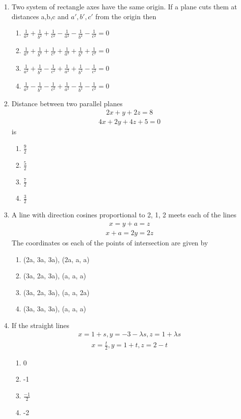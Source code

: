 \begin{enumerate}[label=\arabic*.,ref=\thesubsection.\theenumi]
\item Two system of rectangle axes have the same origin. If a plane cuts them at distances a,b,c and $a',b',c'$ from the origin then
\begin{enumerate}
\item $\frac{1}{a^2} + \frac{1}{b^2} + \frac{1}{c^2} - \frac{1}{a^2} - \frac{1}{b^2} - \frac{1}{c^2} = 0$
\item $\frac{1}{a^2} + \frac{1}{b^2} + \frac{1}{c^2} + \frac{1}{a^2} + \frac{1}{b^2} + \frac{1}{c^2} = 0$
\item $\frac{1}{a^2} + \frac{1}{b^2} - \frac{1}{c^2} + \frac{1}{a^2} + \frac{1}{b^2} - \frac{1}{c^2} = 0$
\item $\frac{1}{a^2} - \frac{1}{b^2} - \frac{1}{c^2} + \frac{1}{a^2} - \frac{1}{b^2} - \frac{1}{c^2} = 0$
\end{enumerate}

\item Distance between two parallel planes 
\begin{align}
2x + y + 2z = 8
\end{align}
\begin{align}
4x + 2y + 4z + 5 = 0 
\end{align}
is
\begin{enumerate}
\item $\frac{9}{2}$
\item $\frac{5}{2}$
\item $\frac{7}{2}$
\item $\frac{3}{2}$
\end{enumerate}

\item A line with direction cosines proportional to 2, 1, 2 meets each of the lines 
\begin{align}
x = y + a = z
\end{align}
\begin{align}
x + a = 2y = 2z
\end{align}
The coordinates os each of the points of intersection are given by
\begin{enumerate}
\item (2a, 3a, 3a), (2a, a, a)
\item (3a, 2a, 3a), (a, a, a)
\item (3a, 2a, 3a), (a, a, 2a)
\item (3a, 3a, 3a), (a, a, a)
\end{enumerate}

\item If the straight lines
\begin{align}
x = 1 + s, y = -3 -\lambda s, z = 1 + \lambda s
\end{align}
\begin{align}
x = \frac{t}{2}, y = 1 + t, z = 2 - t
\end{align}
\begin{enumerate}
\item 0
\item -1
\item $\frac{-1}{2}$
\item -2
\end{enumerate}


\end{enumerate}
